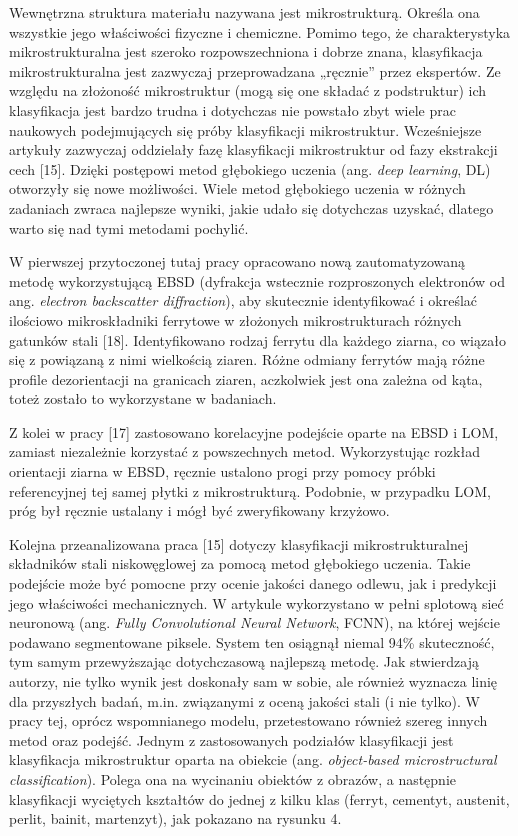 Wewnętrzna struktura materiału nazywana jest mikrostrukturą. Określa ona wszystkie jego właściwości fizyczne i chemiczne. Pomimo tego, że charakterystyka mikrostrukturalna jest szeroko rozpowszechniona i dobrze znana, klasyfikacja mikrostrukturalna jest zazwyczaj przeprowadzana „ręcznie” przez ekspertów. Ze względu na złożoność mikrostruktur (mogą się one składać z podstruktur) ich klasyfikacja jest bardzo trudna i dotychczas nie powstało zbyt wiele prac naukowych podejmujących się próby klasyfikacji mikrostruktur. Wcześniejsze artykuły zazwyczaj oddzielały fazę klasyfikacji mikrostruktur od fazy ekstrakcji cech [15]. Dzięki postępowi metod głębokiego uczenia (ang. \textit{deep learning}, DL) otworzyły się nowe możliwości. Wiele metod głębokiego uczenia w różnych zadaniach zwraca najlepsze wyniki, jakie udało się dotychczas uzyskać, dlatego warto się nad tymi metodami pochylić. 

W pierwszej przytoczonej tutaj pracy opracowano nową zautomatyzowaną metodę wykorzystującą EBSD (dyfrakcja wstecznie rozproszonych elektronów od ang. \textit{electron backscatter diffraction}), aby skutecznie identyfikować i określać ilościowo mikroskładniki ferrytowe w złożonych mikrostrukturach różnych gatunków stali [18]. Identyfikowano rodzaj ferrytu dla każdego ziarna, co wiązało się z powiązaną z nimi wielkością ziaren. Różne odmiany ferrytów mają różne profile dezorientacji na granicach ziaren, aczkolwiek jest ona zależna od kąta, toteż zostało to wykorzystane w badaniach.

Z kolei w pracy [17] zastosowano korelacyjne podejście oparte na EBSD i LOM, zamiast niezależnie korzystać z powszechnych metod. Wykorzystując rozkład orientacji ziarna w EBSD, ręcznie ustalono progi przy pomocy próbki referencyjnej tej samej płytki z mikrostrukturą. Podobnie, w przypadku LOM, próg był ręcznie ustalany i mógł być zweryfikowany krzyżowo.

Kolejna przeanalizowana praca [15] dotyczy klasyfikacji mikrostrukturalnej składników stali niskowęglowej za pomocą metod głębokiego uczenia. Takie podejście może być pomocne przy ocenie jakości danego odlewu, jak i predykcji jego właściwości mechanicznych. W artykule wykorzystano w pełni splotową sieć neuronową (ang. \textit{Fully Convolutional Neural Network}, FCNN), na której wejście podawano segmentowane piksele. System ten osiągnął niemal 94\% skuteczność, tym samym przewyższając dotychczasową najlepszą metodę. Jak stwierdzają autorzy, nie tylko wynik jest doskonały sam w sobie, ale również wyznacza linię dla przyszłych badań, m.in. związanymi z oceną jakości stali (i nie tylko). W pracy tej, oprócz wspomnianego modelu, przetestowano również szereg innych metod oraz podejść. Jednym z zastosowanych podziałów klasyfikacji jest klasyfikacja mikrostruktur oparta na obiekcie (ang. \textit{object-based microstructural classification}). Polega ona na wycinaniu obiektów z obrazów, a następnie klasyfikacji wyciętych kształtów do jednej z kilku klas (ferryt, cementyt, austenit, perlit, bainit, martenzyt), jak pokazano na rysunku 4.  

